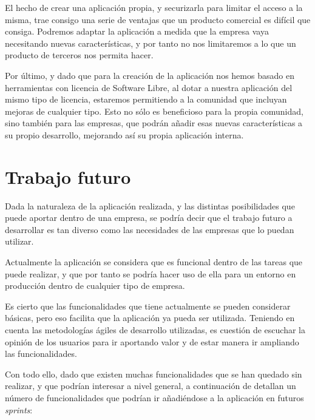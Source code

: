 \documentclass{\ClassPath/viu-tfm-template}
\begin{document}
El hecho de crear una aplicación propia, y securizarla para limitar el acceso a la misma, trae consigo una serie de ventajas que un producto comercial es difícil que consiga. Podremos adaptar la aplicación a medida que la empresa vaya necesitando nuevas características, y por tanto no nos limitaremos a lo que un producto de terceros nos permita hacer.

Por último, y dado que para la creación de la aplicación nos hemos basado en herramientas con licencia de Software Libre, al dotar a nuestra aplicación del mismo tipo de licencia, estaremos permitiendo a la comunidad que incluyan mejoras de cualquier tipo. Esto no sólo es beneficioso para la propia comunidad, sino también para las empresas, que podrán añadir esas nuevas características a su propio desarrollo, mejorando así su propia aplicación interna.


\vfill
\pagebreak

\chapter{Trabajo futuro}

Dada la naturaleza de la aplicación realizada, y las distintas posibilidades que puede aportar dentro de una empresa, se podría decir que el trabajo futuro a desarrollar es tan diverso como las necesidades de las empresas que lo puedan utilizar.

Actualmente la aplicación se considera que es funcional dentro de las tareas que puede realizar, y que por tanto se podría hacer uso de ella para un entorno en producción dentro de cualquier tipo de empresa.

Es cierto que las funcionalidades que tiene actualmente se pueden considerar básicas, pero eso facilita que la aplicación ya pueda ser utilizada. Teniendo en cuenta las metodologías ágiles de desarrollo utilizadas, es cuestión de escuchar la opinión de los usuarios para ir aportando valor y de estar manera ir ampliando las funcionalidades.

Con todo ello, dado que existen muchas funcionalidades que se han quedado sin realizar, y que podrían interesar a nivel general, a continuación de detallan un número de funcionalidades que podrían ir añadiéndose a la aplicación en futuros \textit{sprints}:
\end{document}
